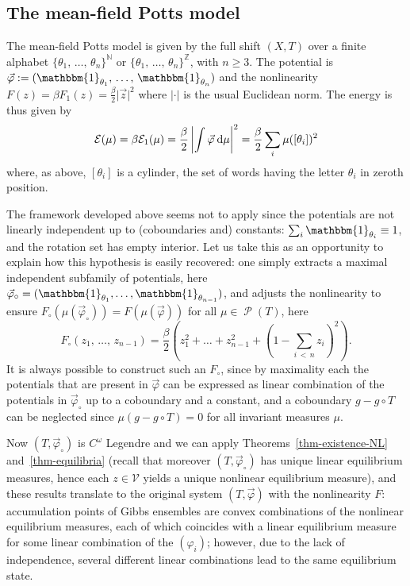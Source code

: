 \documentclass[AHL, Unicode, longabstracts,published]{cedram}
\theoremstyle{plain}
\theoremstyle{plain}
\newcommand\Prob{{\operatorname{\mathscr{P}}}}
\newcommand*{\dd} {\relax\ifnum\lastnodetype>0\mskip\medmuskip\fi\mathrm{d}}
\newcommand{\pot}{\varphi}
\newcommand*\8{\infty}
\newcommand*\N{\mathbb{N}}
\newcommand{\Z}{\mathbb{Z}}
\newcommand{\En}{\mathcal{E}}
\newcommand{\scV}{\mathscr{V}}
\begin{document}
\subsection{The mean-field Potts model}\label{subsec:potts}

The mean-field Potts model is given by the full shift $(X,T)$ over a finite alphabet $\{\theta_{1},\,\ldots,\,\theta_{n}\}^{\N}$ or $\{\theta_{1},\,\ldots,\,\theta_{n}\}^{\Z}$, with $n\geq3$. The potential is $\vec\pot:=(\mathbbm{1}_{\theta_{1}},\,\ldots,\,\mathbbm{1}_{\theta_{n}})$ and the nonlinearity $F(z)=\beta F_1(z)=\frac\beta2 \lvert \vec z\rvert^2$ where $\lvert\cdot\rvert$ is the usual Euclidean norm. The energy is thus given by
\[
\En(\mu) = \beta\En_1(\mu)=\frac\beta2 \left\lvert\int \vec\pot \dd\mu\right\rvert^2 = \frac\beta2 \sum_i \mu([\theta_i])^2
\]
where, as above, $[\theta_i]$ is a cylinder, the set of words having the letter $\theta_i$ in zeroth position.

The framework developed above seems not to apply since the potentials are not linearly independent up to (coboundaries and) constants: $\sum_i \mathbbm{1}_{\theta_{i}} \equiv 1$, and the rotation set has empty interior. Let us take this as an opportunity to explain how this hypothesis is easily recovered: one simply extracts a maximal independent subfamily of potentials, here $\vec\pot_\circ = (\mathbbm{1}_{\theta_{1}},\ldots, \mathbbm{1}_{\theta_{n-1}})$, and adjusts the nonlinearity to ensure $F_\circ(\mu(\vec\pot_\circ))=F(\mu(\vec\pot))$ for all $\mu\in\Prob(T)$, here
\[
F_\circ(z_1,\,\dots,\,z_{n-1}) = \frac\beta2 \left(z_1^2+\dots+z_{n-1}^2+\left(1-\sum_{i\,<\,n} z_i\right)^2\right).
\]
It is always possible to construct such an $F_\circ$, since by maximality each the potentials that are present in $\vec \pot$ can be expressed as linear combination of the potentials in $\vec\pot_\circ$ up to a coboundary and a constant, and a coboundary $g-g\circ T$ can be neglected since $\mu(g-g\circ T)=0$ for all invariant measures $\mu$.

Now $(T,\vec\pot_\circ)$ is {$C^\omega$ Legendre} and we can apply Theorems~\ref{thm-existence-NL} and~\ref{thm-equilibria} (recall that moreover $(T,\vec\pot_\circ)$ has unique linear equilibrium measures, hence each $z\in\scV$ yields a unique nonlinear equilibrium measure), and these results translate to the original system $(T,\vec\pot)$ with the nonlinearity $F$: accumulation points of Gibbs ensembles are convex combinations of the nonlinear equilibrium measures, each of which coincides with a linear equilibrium measure for some linear combination of the $(\pot_i)$; however, due to the lack of independence, several different linear combinations lead to the same equilibrium state.
\end{document}
